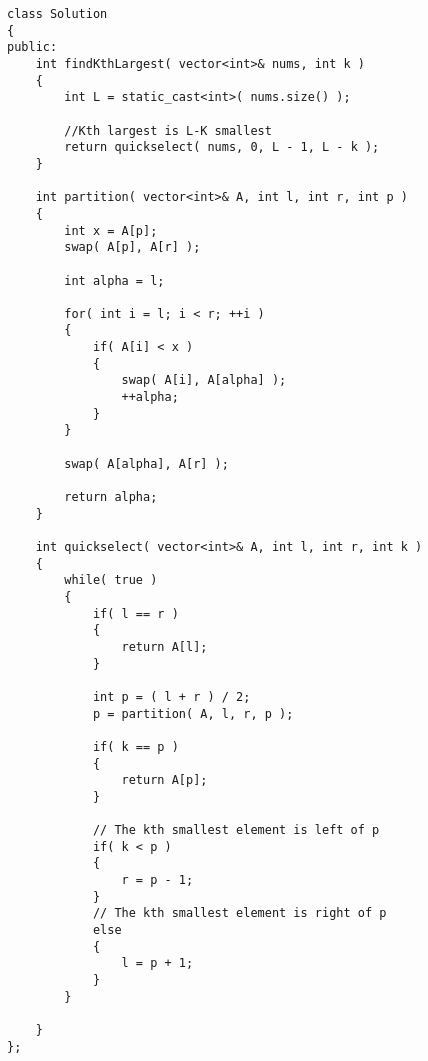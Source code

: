 \setcounter{lstlisting}{0}
\begin{lstlisting}[style=customc, caption={Quick Select}]
class Solution
{
public:
    int findKthLargest( vector<int>& nums, int k )
    {
        int L = static_cast<int>( nums.size() );

		//Kth largest is L-K smallest
        return quickselect( nums, 0, L - 1, L - k );
    }

    int partition( vector<int>& A, int l, int r, int p )
    {
        int x = A[p];
        swap( A[p], A[r] );

        int alpha = l;

        for( int i = l; i < r; ++i )
        {
            if( A[i] < x )
            {
                swap( A[i], A[alpha] );
                ++alpha;
            }
        }

        swap( A[alpha], A[r] );

        return alpha;
    }

    int quickselect( vector<int>& A, int l, int r, int k )
    {
        while( true )
        {
            if( l == r )
            {
                return A[l];
            }

            int p = ( l + r ) / 2;
            p = partition( A, l, r, p );

            if( k == p )
            {
                return A[p];
            }

			// The kth smallest element is left of p
            if( k < p )
            {
                r = p - 1;
            }
            // The kth smallest element is right of p
            else
            {
                l = p + 1;
            }
        }

    }
};
\end{lstlisting}

 
